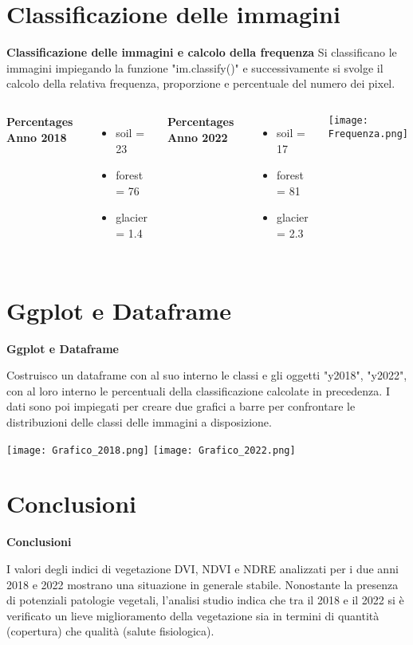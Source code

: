 \documentclass{beamer}
\begin{document}
\section{Classificazione delle immagini}

\begin{frame}
{\Large\textbf{Classificazione delle immagini e calcolo della frequenza}}
\vspace{-1cm}
Si classificano le immagini impiegando la funzione "im.classify()" e successivamente si svolge il calcolo della relativa frequenza, proporzione e percentuale del numero dei pixel.
\begin{columns}
    
\vspace{+0.5cm}
\raggedright\textbf{Percentages Anno 2018}
\begin{itemize} 
\item soil = 23
\item forest = 76
\item glacier = 1.4
\end{itemize} 
\textbf{Percentages Anno 2022}
\begin{itemize} 
\item soil = 17
\item forest = 81
\item glacier = 2.3
\end{itemize} 
    \texttt{[image: Frequenza.png]}
\end{columns}
\end{frame}

\section{Ggplot e Dataframe}

\begin{frame}
{\Large\textbf{Ggplot e Dataframe}}

Costruisco un dataframe con al suo interno le classi e gli oggetti "y2018", "y2022", con al loro interno le percentuali della classificazione calcolate in precedenza.
I dati sono poi impiegati per creare due grafici a barre per confrontare le distribuzioni delle classi delle immagini a disposizione.


    \centering
    \texttt{[image: Grafico\_2018.png]}
    \texttt{[image: Grafico\_2022.png]}
\end{frame}
 
\section{Conclusioni}

\begin{frame}
{\Large\textbf{Conclusioni}}

I valori degli indici di vegetazione DVI, NDVI e NDRE analizzati per i due anni 2018 e 2022 mostrano una situazione in generale stabile.
Nonostante la presenza di potenziali patologie vegetali, l'analisi studio indica che tra il 2018 e il 2022 si è verificato un lieve miglioramento della vegetazione sia in termini di quantità (copertura) che qualità (salute fisiologica).
\end{frame}
\end{document}
